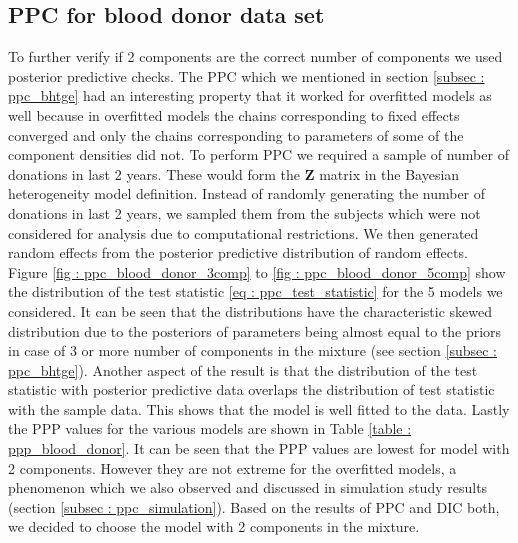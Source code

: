 \subsection{PPC for blood donor data set}
To further verify if 2 components are the correct number of components we used posterior predictive checks. The PPC which we mentioned in section \ref{subsec : ppc_bhtge} had an interesting property that it worked for overfitted models as well because in overfitted models the chains corresponding to fixed effects converged and only the chains corresponding to parameters of some of the component densities did not. To perform PPC we required a sample of number of donations in last 2 years. These would form the $\boldsymbol{Z}$ matrix in the Bayesian heterogeneity model definition. Instead of randomly generating the number of donations in last 2 years, we sampled them from the subjects which were not considered for analysis due to computational restrictions. We then generated random effects from the posterior predictive distribution of random effects. Figure \ref{fig : ppc_blood_donor_3comp} to \ref{fig : ppc_blood_donor_5comp} show the distribution of the test statistic \ref{eq : ppc_test_statistic} for the 5 models we considered. It can be seen that the distributions have the characteristic skewed distribution due to the posteriors of parameters being almost equal to the priors in case of 3 or more number of components in the mixture (see section \ref{subsec : ppc_bhtge}). Another aspect of the result is that the distribution of the test statistic with posterior predictive data overlaps the distribution of test statistic with the sample data. This shows that the model is well fitted to the data. Lastly the PPP values for the various models are shown in Table \ref{table : ppp_blood_donor}. It can be seen that the PPP values are lowest for model with 2 components. However they are not extreme for the overfitted models, a phenomenon which we also observed and discussed in simulation study results (section \ref{subsec : ppc_simulation}). Based on the results of PPC and DIC both, we decided to choose the model with 2 components in the mixture.

